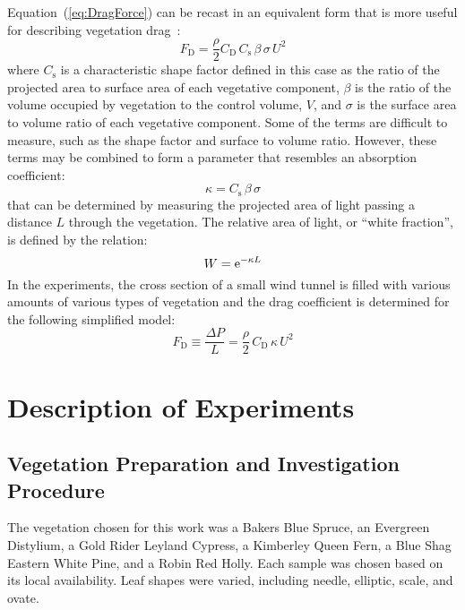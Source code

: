 \documentclass[12pt]{article}
\begin{document}
Equation~(\ref{eq:DragForce}) can be recast in an equivalent form that is more useful for describing vegetation drag~\cite{Mueller2014}:
\begin{equation}
\label{eq:DragForcea}
F_{\mathrm{D}}  = \frac{\rho}{2} C_{\mathrm{D}} \, C_{\mathrm{s}} \, \beta \, \sigma \, U^2
\end{equation}
where $C_{\mathrm{s}}$ is a characteristic shape factor defined in this case as the ratio of the projected area to surface area of each vegetative component, $\beta$ is the ratio of the volume occupied by vegetation to the control volume, $V$, and $\sigma$ is the surface area to volume ratio of each vegetative component. Some of the terms are difficult to measure, such as the shape factor and surface to volume ratio. However, these terms may be combined to form a parameter that resembles an absorption coefficient:
\begin{equation}
\label{eq:WhiteFraction}
\kappa = C_{\mathrm{s}} \, \beta \, \sigma
\end{equation}
that can be determined by measuring the projected area of light passing a distance $L$ through the vegetation. The relative area of light, or ``white fraction'', is defined by the relation:
\begin{equation}\label{eq:WhiteFraction}
W = {\rm e}^{-\kappa L}
\end{equation}
In the experiments, the cross section of a small wind tunnel is filled with various amounts of various types of vegetation and the drag coefficient is determined for the following simplified model:
\begin{equation}\label{eq:Pressure}
F_{\mathrm{D}} \equiv \frac{\Delta P}{L}  = \frac{\rho}{2} \, C_{\mathrm{D}} \, \kappa \, U^2
\end{equation}



\section{Description of Experiments}
\label{sec:Experiments}
\subsection{Vegetation Preparation and Investigation Procedure}
\label{ssec:headingscap}

The vegetation chosen for this work was a Bakers Blue Spruce, an Evergreen Distylium, a Gold Rider Leyland Cypress, a Kimberley Queen Fern, a Blue Shag Eastern White Pine, and a Robin Red Holly. Each sample was chosen based on its local availability. Leaf shapes were varied, including needle, elliptic, scale, and ovate.
\end{document}
